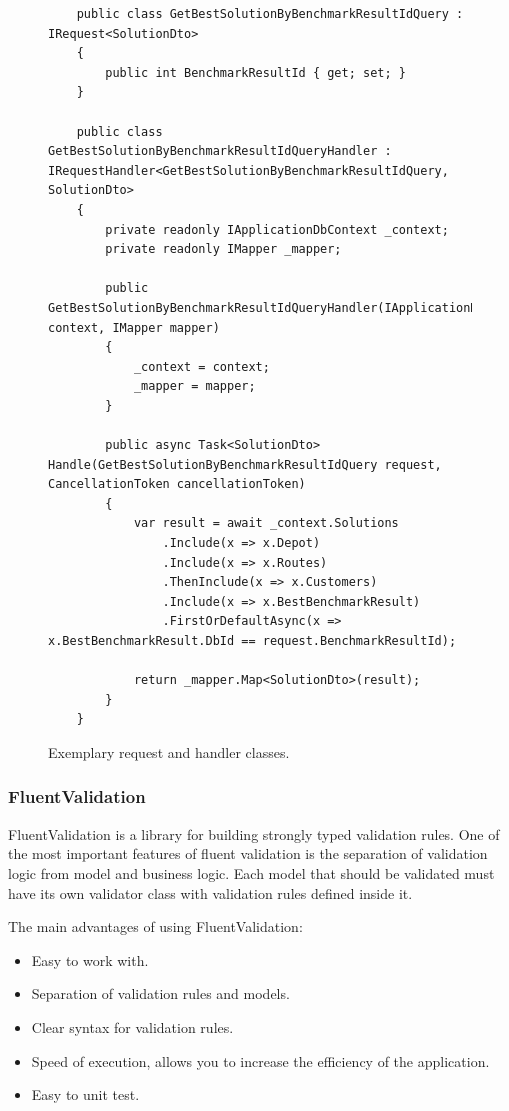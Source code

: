 \documentclass[a4paper,twoside,12pt]{book}
\begin{document}
\begin{figure}
\centering
\begin{lstlisting}
    public class GetBestSolutionByBenchmarkResultIdQuery : IRequest<SolutionDto>
    {
        public int BenchmarkResultId { get; set; }
    }

    public class GetBestSolutionByBenchmarkResultIdQueryHandler : IRequestHandler<GetBestSolutionByBenchmarkResultIdQuery, SolutionDto>
    {
        private readonly IApplicationDbContext _context;
        private readonly IMapper _mapper;

        public GetBestSolutionByBenchmarkResultIdQueryHandler(IApplicationDbContext context, IMapper mapper)
        {
            _context = context;
            _mapper = mapper;
        }

        public async Task<SolutionDto> Handle(GetBestSolutionByBenchmarkResultIdQuery request, CancellationToken cancellationToken)
        {
            var result = await _context.Solutions
                .Include(x => x.Depot)
                .Include(x => x.Routes)
                .ThenInclude(x => x.Customers)
                .Include(x => x.BestBenchmarkResult)
                .FirstOrDefaultAsync(x => x.BestBenchmarkResult.DbId == request.BenchmarkResultId);

            return _mapper.Map<SolutionDto>(result);
        }
    }
\end{lstlisting}
\caption{Exemplary request and handler classes.}
\label{fig:mediatR}
\end{figure}


\subsubsection{FluentValidation}
FluentValidation is a library for building strongly typed validation rules. One of the most important features of fluent validation is the separation of validation logic from model and business logic. Each model that should be validated must have its own validator class with validation rules defined inside it. 

The main advantages of using FluentValidation:
\begin{itemize}
\item Easy to work with.
\item Separation of validation rules and models.
\item Clear syntax for validation rules.
\item Speed of execution, allows you to increase the efficiency of the application.
\item Easy to unit test.
\end{itemize}
\end{document}
